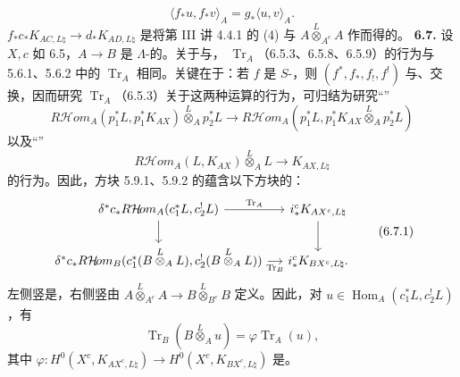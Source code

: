 \begin{equation}\langle f_*u,f_*v\rangle_A=g_*\langle u,v\rangle_A.\tag{6.6.5}\end{equation}
 $f_*c_*K_{AC,L\natural}\to d_*K_{AD,L\natural}$ 是将第 III 讲 4.4.1 的 (4) 与 $A\overset L\otimes_{A^e}A$ 作而得的。
\textbf{6.7.} 设 $X,c$ 如 6.5，$A\to B$ 是 $\Lambda$-的。关于与， $\operatorname{Tr}_A$（6.5.3、6.5.8、6.5.9）的行为与 5.6.1、5.6.2 中的 $\operatorname{Tr}_A$ 相同。关键在于：若 $f$ 是 $S$-，则 $(f^*,f_*,f_!,f^!)$ 与、交换，因而研究 $\operatorname{Tr}_A$（6.5.3）关于这两种运算的行为，可归结为研究“”
\[R\mathcal H\!om_A(p_1^*L,p_1^*K_{AX})\overset L\otimes_Ap_2^*L\longrightarrow R\mathcal H\!om_A(p_1^*L,p_1^*K_{AX}\overset L\otimes_Ap_2^*L)\]
以及“”
\[R\mathcal H\!om_A(L,K_{AX})\overset L\otimes_AL\longrightarrow K_{AX,L\natural}\]
的行为。因此，方块 5.9.1、5.9.2 的蕴含以下方块的：
\begin{equation}\begin{tikzcd}[column sep=small]
\delta^*c_*R\mathcal H\!om_A(c_1^*L,c_2^!L)\arrow[r,"\operatorname{Tr}_A"]\arrow[d]&i_*^cK_{AX^c,L\natural}\arrow[d]\\
\delta^*c_*R\mathcal H\!om_B(c_1^*(B\overset L\otimes_AL),c_2^!(B\overset L\otimes_AL))\arrow[r,"\operatorname{Tr}_B"']&i_*^cK_{BX^c,L\natural}.
\end{tikzcd}\tag{6.7.1}\end{equation}
左侧竖是，右侧竖由 $A\overset L\otimes_{A^e}A\to B\overset L\otimes_{B^e}B$ 定义。因此，对 $u\in\operatorname{Hom}_A(c_1^*L,c_2^!L)$，有
\begin{equation}\operatorname{Tr}_B(B\overset L\otimes_Au)=\varphi\operatorname{Tr}_A(u),\tag{6.7.2}\end{equation}
其中 $\varphi:H^0(X^c,K_{AX^c,L\natural})\to H^0(X^c,K_{BX^c,L\natural})$ 是。

